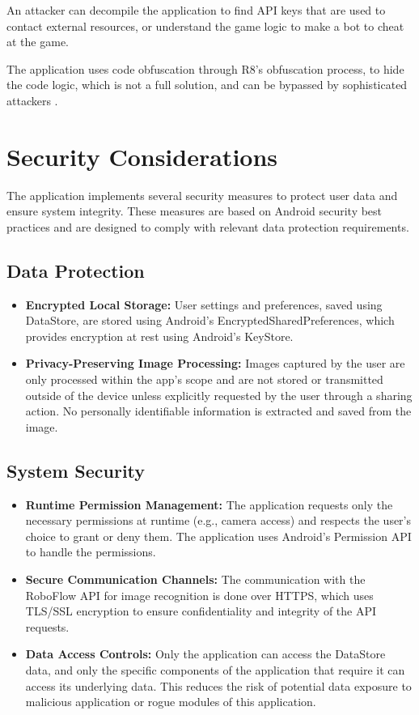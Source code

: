 An attacker can decompile the application to find API keys that are used to contact external resources, or understand the game logic to make a bot to cheat at the game.

The application uses code obfuscation through R8's obfuscation process, to hide the code logic, which is not a full solution, and can be bypassed by sophisticated attackers \cite{bib:android_obfuscation}.

\section{Security Considerations}

The application implements several security measures to protect user data and ensure system integrity. These measures are based on Android security best practices and are designed to comply with relevant data protection requirements.

\subsection{Data Protection}

\begin{itemize}
    \item \textbf{Encrypted Local Storage:} User settings and preferences, saved using DataStore, are stored using Android's EncryptedSharedPreferences, which provides encryption at rest using Android's KeyStore.
    \item \textbf{Privacy-Preserving Image Processing:} Images captured by the user are only processed within the app's scope and are not stored or transmitted outside of the device unless explicitly requested by the user through a sharing action. No personally identifiable information is extracted and saved from the image.
\end{itemize}

\subsection{System Security}

\begin{itemize}
    \item \textbf{Runtime Permission Management:} The application requests only the necessary permissions at runtime (e.g., camera access) and respects the user's choice to grant or deny them. The application uses Android's Permission API to handle the permissions.
    \item \textbf{Secure Communication Channels:} The communication with the RoboFlow API for image recognition is done over HTTPS, which uses TLS/SSL encryption to ensure confidentiality and integrity of the API requests.
     \item \textbf{Data Access Controls:} Only the application can access the DataStore data, and only the specific components of the application that require it can access its underlying data. This reduces the risk of potential data exposure to malicious application or rogue modules of this application.
\end{itemize}


